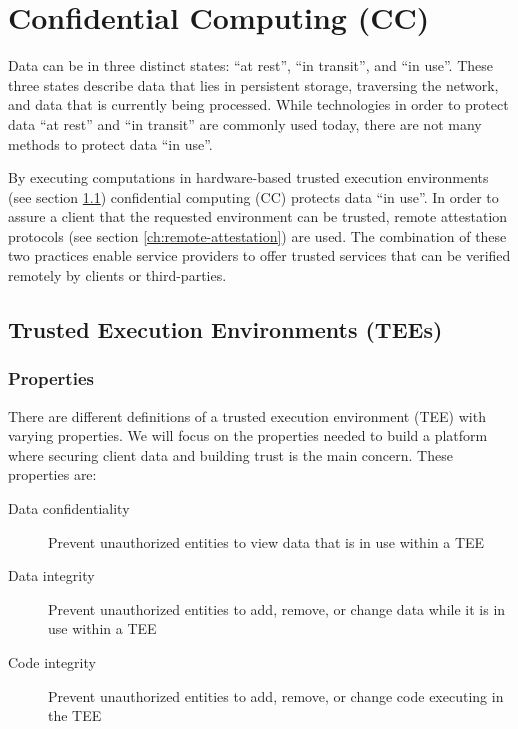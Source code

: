 \section{Confidential Computing (CC)}
\label{ch:confidential-computing}

Data can be in three distinct states: ``at rest'', ``in transit'', and ``in
use''. These three states describe data that lies in persistent storage,
traversing the network, and data that is currently being processed. While
technologies in order to protect data ``at rest'' and ``in transit'' are
commonly used today, there are not many methods to protect data ``in use''.

By executing computations in hardware-based trusted execution environments (see
section \ref{sec:TEE}) confidential computing (CC) protects data ``in use''. In
order to assure a client that the requested environment can be trusted, remote
attestation protocols (see section \ref{ch:remote-attestation}) are used. The
combination of these two practices enable service providers to offer trusted
services that can be verified remotely by clients or third-parties.

\subsection{Trusted Execution Environments (TEEs)}
\label{sec:TEE}

\subsubsection{Properties}

There are different definitions of a trusted execution environment (TEE) with
varying properties. We will focus on the properties needed to build a platform
where securing client data and building trust is the main concern. These
properties are:

\begin{description}
  \item[Data confidentiality]
    Prevent unauthorized entities to view data that is in use within a TEE
  \item[Data integrity]
    Prevent unauthorized entities to add, remove, or change data while it is in
    use within a TEE
  \item[Code integrity]
    Prevent unauthorized entities to add, remove, or change code executing in the
    TEE
\end{description}


